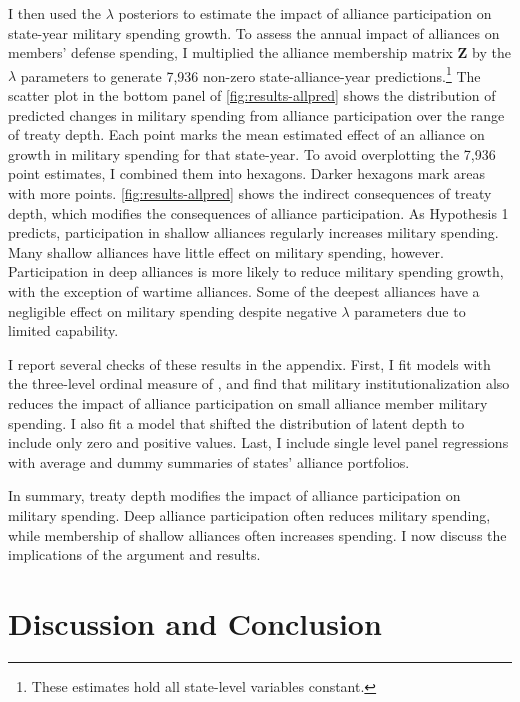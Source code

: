 \documentclass[12pt]{article}
\begin{document}
I then used the $\lambda$ posteriors to estimate the impact of alliance participation on state-year military spending growth. 
To assess the annual impact of alliances on members' defense spending, I multiplied the alliance membership matrix $\textbf{Z}$ by the $\lambda$ parameters to generate 7,936 non-zero state-alliance-year predictions.\footnote{These estimates hold all state-level variables constant.} 
The scatter plot in the bottom panel of \autoref{fig:results-allpred} shows the distribution of predicted changes in military spending from alliance participation over the range of treaty depth.
Each point marks the mean estimated effect of an alliance on growth in military spending for that state-year.
To avoid overplotting the 7,936 point estimates, I combined them into hexagons. 
Darker hexagons mark areas with more points. 
\autoref{fig:results-allpred} shows the indirect consequences of treaty depth, which modifies the consequences of alliance participation. 
As Hypothesis 1 predicts, participation in shallow alliances regularly increases military spending. 
Many shallow alliances have little effect on military spending, however. 
Participation in deep alliances is more likely to reduce military spending growth, with the exception of wartime alliances. 
Some of the deepest alliances have a negligible effect on military spending despite negative $\lambda$ parameters due to limited capability. 


I report several checks of these results in the appendix.
First, I fit models with the three-level ordinal measure of \citep{LeedsAnac2005}, and find that military institutionalization also reduces the impact of alliance participation on small alliance member military spending. 
I also fit a model that shifted the distribution of latent depth to include only zero and positive values. 
Last, I include single level panel regressions with average and dummy summaries of states' alliance portfolios. 


In summary, treaty depth modifies the impact of alliance participation on military spending.  
Deep alliance participation often reduces military spending, while membership of shallow alliances often increases spending. 
I now discuss the implications of the argument and results. 



\section{Discussion and Conclusion}
\end{document}
